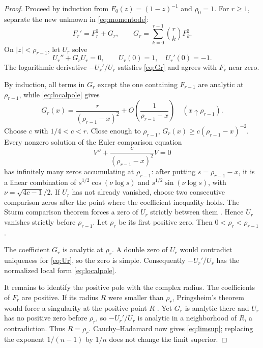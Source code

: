 \documentclass[10pt,a4paper]{amsart}
\theoremstyle{definition}
\theoremstyle{remark}
\begin{document}
\begin{proof}
Proceed by induction from $F_0(z)=(1-z)^{-1}$ and $\rho_0=1$.  For
$r\geq1$, separate the new unknown in \eqref{eq:momentode}:
\begin{equation}\label{eq:Gr}
 F_r'=F_r^2+G_r,\qquad
 G_r=\sum_{k=0}^{r-1}\binom rk F_k^2.
\end{equation}
On $|z|<\rho_{r-1}$, let $U_r$ solve
\begin{equation}\label{eq:Ur}
 U_r''+G_rU_r=0,\qquad U_r(0)=1,\quad U_r'(0)=-1.
\end{equation}
The logarithmic derivative $-U_r'/U_r$ satisfies \eqref{eq:Gr} and agrees
with $F_r$ near zero.

By induction, all terms in $G_r$ except the one containing $F_{r-1}$ are
analytic at $\rho_{r-1}$, while \eqref{eq:localpole} gives
\begin{equation}\label{eq:Gedge}
 G_r(x)=\frac{r}{(\rho_{r-1}-x)^2}
        +O\!\left(\frac1{\rho_{r-1}-x}\right)
 \quad (x\uparrow\rho_{r-1}).
\end{equation}
Choose $c$ with $1/4<c<r$.  Close enough to $\rho_{r-1}$,
$G_r(x)\geq c(\rho_{r-1}-x)^{-2}$.  Every nonzero solution of the Euler
comparison equation
\[
 V''+\frac{c}{(\rho_{r-1}-x)^2}V=0
\]
has infinitely many zeros accumulating at $\rho_{r-1}$: after putting
$s=\rho_{r-1}-x$, it is a linear combination of
$s^{1/2}\cos(\nu\log s)$ and $s^{1/2}\sin(\nu\log s)$, with
$\nu=\sqrt{4c-1}/2$.  If $U_r$ has not already vanished, choose two
consecutive comparison zeros after the point where the coefficient
inequality holds.  The Sturm comparison theorem forces a zero of $U_r$
strictly between them \cite[Chapter~1]{Zettl2005}.  Hence $U_r$ vanishes
strictly before $\rho_{r-1}$.  Let $\rho_r$ be its first positive zero.
Then $0<\rho_r<\rho_{r-1}$.

The coefficient $G_r$ is analytic at $\rho_r$.  A double zero of $U_r$
would contradict uniqueness for \eqref{eq:Ur}, so the zero is simple.
Consequently $-U_r'/U_r$ has the normalized local form
\eqref{eq:localpole}.

It remains to identify the positive pole with the complex radius.  The
coefficients of $F_r$ are positive.  If its radius $R$ were smaller than
$\rho_r$, Pringsheim's theorem would force a singularity at the positive
point $R$ \cite[Section~IV.6]{FlajoletSedgewick2009}.  Yet $G_r$ is analytic
there and $U_r$ has no positive zero before $\rho_r$, so $-U_r'/U_r$ is
analytic in a neighborhood of $R$, a contradiction.  Thus $R=\rho_r$.
Cauchy--Hadamard now gives \eqref{eq:limsup}; replacing the exponent
$1/(n-1)$ by $1/n$ does not change the limit superior.
\end{proof}
\end{document}
